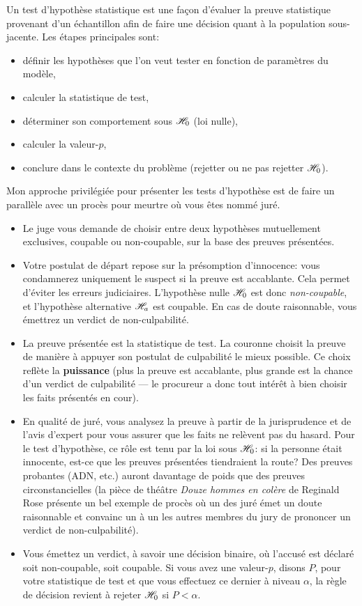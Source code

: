 \documentclass[
  11pt,
  letterpaper,
]{book}
\providecommand{\tightlist}{%
  \setlength{\itemsep}{0pt}\setlength{\parskip}{0pt}}
\begin{document}
Un test d'hypothèse statistique est une façon d'évaluer la preuve statistique provenant d'un échantillon afin de faire une décision quant à la population sous-jacente. Les étapes principales sont:

\begin{itemize}
\tightlist
\item
  définir les hypothèses que l'on veut tester en fonction de paramètres du modèle,
\item
  calculer la statistique de test,
\item
  déterminer son comportement sous \(\mathscr{H}_0\) (loi nulle),
\item
  calculer la valeur-\(p\),
\item
  conclure dans le contexte du problème (rejetter ou ne pas rejetter \(\mathscr{H}_0\)).
\end{itemize}

Mon approche privilégiée pour présenter les tests d'hypothèse est de faire un parallèle avec un procès pour meurtre où vous êtes nommé juré.

\begin{itemize}
\tightlist
\item
  Le juge vous demande de choisir entre deux hypothèses mutuellement exclusives, coupable ou non-coupable, sur la base des preuves présentées.
\item
  Votre postulat de départ repose sur la présomption d'innocence: vous condamnerez uniquement le suspect si la preuve est accablante. Cela permet d'éviter les erreurs judiciaires. L'hypothèse nulle \(\mathscr{H}_0\) est donc \emph{non-coupable}, et l'hypothèse alternative \(\mathscr{H}_a\) est coupable. En cas de doute raisonnable, vous émettrez un verdict de non-culpabilité.
\item
  La preuve présentée est la statistique de test. La couronne choisit la preuve de manière à appuyer son postulat de culpabilité le mieux possible. Ce choix reflète la \textbf{puissance} (plus la preuve est accablante, plus grande est la chance d'un verdict de culpabilité --- le procureur a donc tout intérêt à bien choisir les faits présentés en cour).
\item
  En qualité de juré, vous analysez la preuve à partir de la jurisprudence et de l'avis d'expert pour vous assurer que les faits ne relèvent pas du hasard. Pour le test d'hypothèse, ce rôle est tenu par la loi sous \(\mathscr{H}_0\): si la personne était innocente, est-ce que les preuves présentées tiendraient la route? Des preuves probantes (ADN, etc.) auront davantage de poids que des preuves circonstancielles (la pièce de théâtre \emph{Douze hommes en colère} de Reginald Rose présente un bel exemple de procès où un des juré émet un doute raisonnable et convainc un à un les autres membres du jury de prononcer un verdict de non-culpabilité).
\item
  Vous émettez un verdict, à savoir une décision binaire, où l'accusé est déclaré soit non-coupable, soit coupable. Si vous avez une valeur-\(p\), disons \(P\), pour votre statistique de test et que vous effectuez ce dernier à niveau \(\alpha\), la règle de décision revient à rejeter \(\mathscr{H}_0\) si \(P < \alpha\).
\end{itemize}
\end{document}
